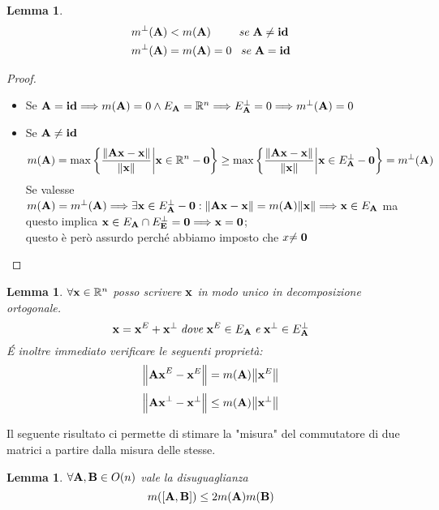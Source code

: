\documentclass[12pt,a4paper]{book}
\newtheorem{lemma}[theorem]{Lemma}
\begin{document}
\begin{lemma}

\begin{equation}
\begin{split}
m^{\perp}(\vb{A})  & < m(\vb{A}) \; \; \; \; \; \; \; \; \; se \; \vb{A \neq id}  \\
 m^{\perp}(\vb{A})  & = m(\vb{A}) = 0 \; \; \;  se \; \vb{A = id}
\end{split}
\end{equation}

\end{lemma}

\begin{proof}
\begin{itemize}
\item Se $\vb{A = id} \Longrightarrow m(\vb{A}) = 0 \land E_{\vb{A}} = \mathbb{R}^n \Longrightarrow E^{\perp}_{\vb{A}} = {0} \Longrightarrow m^{\perp}(\vb{A}) = 0$

\item Se $\vb{A \neq id}$ 
\[ m(\vb{A}) = \max \bigg\{ \frac{\norm{\vb{Ax-x}}}{\norm{\vb{x}}} \bigg|  \vb{x} \in \mathbb{R}^{n}-\vb{0} \bigg\} 
\geq \max \bigg\{ \frac{\norm{\vb{Ax-x}}}{\norm{\vb{x}}} \bigg|  \vb{x} \in E^{\perp}_{\vb{A}} - \vb{0} \bigg\} =  m^{\perp}(\vb{A}) \]
Se valesse $m(\vb{A}) = m^{\perp}(\vb{A}) \Longrightarrow \exists \vb{x} \in E^{\perp}_{\vb{A}} - \vb{0} : \norm{\vb{Ax-x}} = m(\vb{A})\norm{\vb{x}} \Longrightarrow \vb{x} \in E_{\vb{A}}$  ma questo implica $\vb{x} \in E_{\vb{A}} \cap E^{\perp}_{\vb{E}} = {\vb{0}} \Longrightarrow \vb{x = 0} $;  \\
questo è però assurdo perché abbiamo imposto che $x\vb{ \neq 0}$ 
\end{itemize}
\end{proof}

\begin{lemma}
$\forall \vb{x} \in \mathbb{R}^n $ posso scrivere $\vb{x}$ in modo unico in decomposizione ortogonale. 
\[ \vb{x} = \vb{x}^E + \vb{x}^{\perp} \; \mathit{dove} \; \vb{x}^E \in E_{\vb{A}} \; \mathit{e} \; \vb{x}^{\perp} \in E^{\perp}_{\vb{A}} \]
\'E inoltre immediato verificare le seguenti proprietà:
\[ \norm{\vb{Ax}^E - \vb{x}^E }= m(\vb{A})\norm{\vb{x}^E} \] \[\norm{\vb{Ax}^{\perp} - \vb{x}^{\perp}} \leq m(\vb{A}) \norm{\vb{x}^{\perp}} \]
\end{lemma}

Il seguente risultato ci permette di stimare la "misura" del commutatore di due matrici a partire dalla misura delle stesse. 
\begin{lemma}
 $\forall \vb{ A, B} \in O(n)$ vale la disuguaglianza 
 \[ m([\vb{A,B}]) \leq 2m(\vb{A})m(\vb{B}) \]
\end{lemma}
\end{document}
